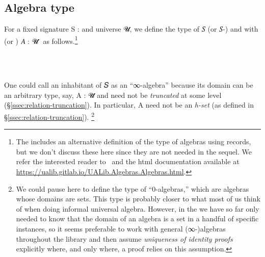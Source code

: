 \documentclass[a4paper,UKenglish,cleveref,autoref,thm-restate,11pt]{lipics-v2021}
\begin{document}
\subsection{Algebra type}\label{ssec:algebra-type}
For a fixed signature \ab S \as : \sigOV and universe \ab 𝓤, we define the type of  \ab 𝑆 (or \ab 𝑆-) and with  (or ) \ab 𝐴 \as : \ab 𝓤 \as ̇ as follows.\footnote{The \agdaualib includes an alternative definition of the type of algebras using records, but we don't discuss these here since they are not needed in the sequel. We refer the interested reader to~\cite{DeMeo:2021} and the html documentation available at \url{https://ualib.gitlab.io/UALib.Algebras.Algebras.html}.}
\ccpad
\begin{code}%
\>[0]\AgdaSpace{}%
\AgdaSymbol{:}\AgdaSpace{}%
\AgdaSymbol{(}\AgdaSpace{}%
\AgdaSymbol{:}\AgdaSpace{}%
\AgdaSymbol{)(}\AgdaSpace{}%
\AgdaSymbol{:}\AgdaSpace{}%
\AgdaSpace{}%
\AgdaSpace{}%
\AgdaSymbol{)}\AgdaSpace{}%
%
\>[50]\AgdaSpace{}%
\AgdaSpace{}%
\AgdaSpace{}%
\AgdaSpace{}%
\AgdaSpace{}%
%
\<%
\\
%
\\[\AgdaEmptyExtraSkip]%
\>[0]\AgdaSpace{}%
%
\>[13]\AgdaSpace{}%
\AgdaSymbol{=}\AgdaSpace{}%
\AgdaSpace{}%
\AgdaSpace{}%
\AgdaSpace{}%
\AgdaSpace{}%
\AgdaSpace{}%
\AgdaFunction{,}\AgdaSpace{}%
\AgdaSymbol{((}\AgdaSpace{}%
\AgdaSymbol{:}\AgdaSpace{}%
\AgdaSpace{}%
\AgdaSpace{}%
\AgdaSymbol{)}\AgdaSpace{}%
\AgdaSpace{}%
\AgdaSpace{}%
\AgdaSymbol{(}\AgdaSpace{}%
\AgdaSpace{}%
\AgdaSpace{}%
\AgdaSymbol{)}\AgdaSpace{}%
\AgdaSymbol{)}\<%
\end{code}
\ccpad
One could call an inhabitant of  \ab 𝑆  as an ``∞-algebra'' because its domain can be an arbitrary type, say, \ab A \as : \ab 𝓤\af ̇ and need not be \emph{truncated} at some level (\S\ref{ssec:relation-truncation}). In particular, \ab A need not be an \emph{h-set} (as defined in \S\ref{ssec:relation-truncation}).%
%
\footnote{We could pause here to define the type of ``0-algebras,'' which are algebras whose domains are sets. This type is probably closer to what most of us think of when doing informal universal algebra. However, in the \ualib we have so far only needed to know that the domain of an algebra is a set in a handful of specific instances, so it seems preferable to work with general (∞-)algebras throughout the library and then assume \emph{uniqueness of identity proofs} explicitly where, and only where, a proof relies on this assumption.}
\end{document}
